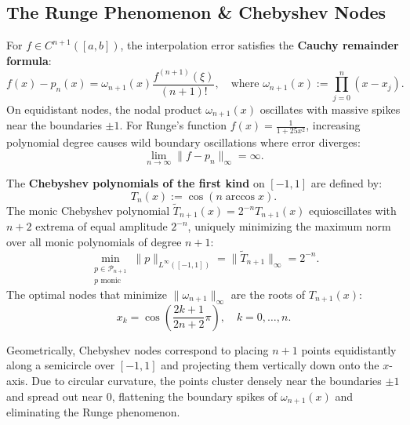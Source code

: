 \subsection{The Runge Phenomenon \& Chebyshev Nodes}

For $f \in C^{n+1}([a, b])$, the interpolation error satisfies the \textbf{Cauchy remainder formula}:
\begin{equation}
    f(x) - p_n(x) = \omega_{n+1}(x) \frac{f^{(n+1)}(\xi)}{(n+1)!}, \quad \text{where } \omega_{n+1}(x) := \prod_{j=0}^{n} (x - x_j).
\end{equation}
On equidistant nodes, the nodal product $\omega_{n+1}(x)$ oscillates with massive spikes near the boundaries $\pm 1$. For Runge's function $f(x) = \frac{1}{1 + 25x^2}$, increasing polynomial degree causes wild boundary oscillations where error diverges:
\begin{equation}
    \lim_{n \to \infty} \|f - p_n\|_\infty = \infty.
\end{equation}

\begin{theorem}
    The \textbf{Chebyshev polynomials of the first kind} on $[-1, 1]$ are defined by:
    \begin{equation}
        T_n(x) := \cos(n \arccos x).
    \end{equation}
    The monic Chebyshev polynomial $\widetilde{T}_{n+1}(x) = 2^{-n} T_{n+1}(x)$ equioscillates with $n+2$ extrema of equal amplitude $2^{-n}$, uniquely minimizing the maximum norm over all monic polynomials of degree $n+1$:
    \begin{equation}
        \min_{\substack{p \in \mathcal{P}_{n+1} \\ p \text{ monic}}} \|p\|_{L^\infty([-1, 1])} = \|\widetilde{T}_{n+1}\|_\infty = 2^{-n}.
    \end{equation}
    The optimal nodes that minimize $\|\omega_{n+1}\|_\infty$ are the roots of $T_{n+1}(x)$:
    \begin{equation}
        x_k = \cos\left( \frac{2k + 1}{2n + 2} \pi \right), \quad k = 0, \dots, n.
    \end{equation}
\end{theorem}

Geometrically, Chebyshev nodes correspond to placing $n+1$ points equidistantly along a semicircle over $[-1, 1]$ and projecting them vertically down onto the $x$-axis. Due to circular curvature, the points cluster densely near the boundaries $\pm 1$ and spread out near $0$, flattening the boundary spikes of $\omega_{n+1}(x)$ and eliminating the Runge phenomenon.

